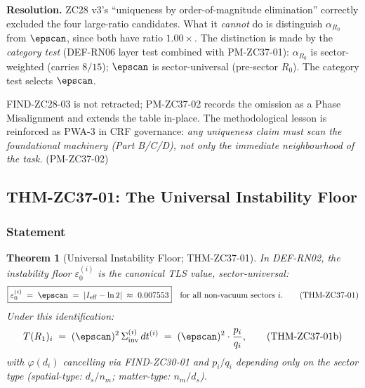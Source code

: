 \documentclass[12pt, a4paper]{article}
\newtheorem{theorem}{Theorem}[section]
\begin{document}
\begin{openqbox}[title={PM-ZC37-02: FIND-ZC28-03 elimination omitted
  $\epscan$}]
\medskip
\textbf{Resolution.}
ZC28 v3's ``uniqueness by order-of-magnitude elimination''
correctly excluded the four large-ratio candidates. What it
\emph{cannot} do is distinguish $\alpha_{R_0}$ from $\epscan$,
since both have ratio $1.00\times$. The distinction is made
by the \emph{category test} (DEF-RN06 layer test combined
with PM-ZC37-01): $\alpha_{R_0}$ is sector-weighted (carries
$8/15$); $\epscan$ is sector-universal (pre-sector $R_0$).
The category test selects $\epscan$.

\medskip
FIND-ZC28-03 is not retracted; PM-ZC37-02 records the omission
as a Phase Misalignment and extends the table in-place.
The methodological lesson is reinforced as PWA-3 in CRF
governance: \emph{any uniqueness claim must scan the
foundational machinery (Part B/C/D), not only the immediate
neighbourhood of the task.}
\hfill\textup{(PM-ZC37-02)}
\end{openqbox}

\subsection{THM-ZC37-01: The Universal Instability Floor}
\label{sec:theorem}

\subsubsection{Statement}

\begin{theorem}[Universal Instability Floor; THM-ZC37-01]
\label{thm:zc37-01}
In DEF-RN02, the instability floor $\varepsilon_0^{(i)}$ is
the canonical TLS value, sector-universal:
\begin{equation}
  \boxed{
  \varepsilon_0^{(i)} \;=\; \epscan
  \;=\; |I_{\rm eff} - \ln 2|
  \;\approx\; 0.007553
  }
  \quad\text{for all non-vacuum sectors } i.
  \tag{THM-ZC37-01}\label{thm:eps-universal}
\end{equation}
Under this identification:
\begin{equation}
  T(R_1)_i
  \;=\; (\epscan)^2\,\Sigma_{\rm inv}^{(i)}\,dt^{(i)}
  \;=\; (\epscan)^2\cdot\frac{p_i}{q_i},
  \tag{THM-ZC37-01b}
\end{equation}
with $\varphi(d_i)$ cancelling via FIND-ZC30-01
and $p_i/q_i$ depending only on the sector type
(spatial-type: $d_s/n_m$; matter-type: $n_m/d_s$).
\end{theorem}
\end{document}
